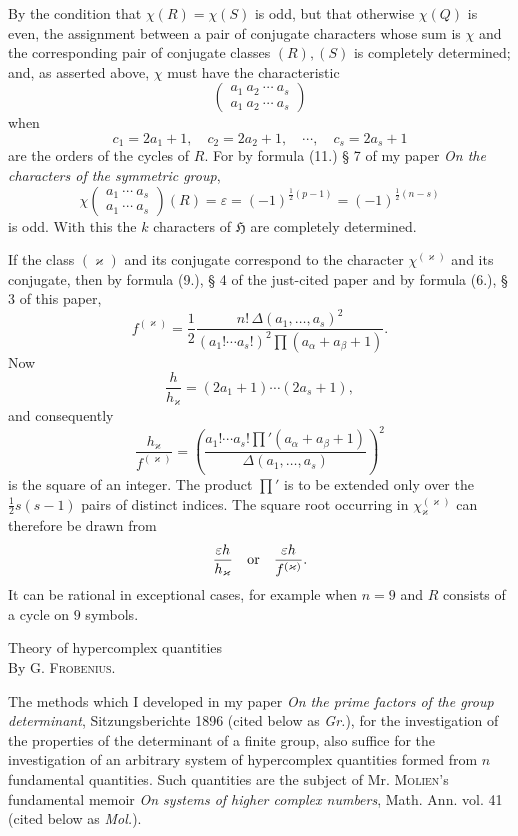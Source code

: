 \documentclass[11pt]{article}
\newcommand{\Hgr}{\mathfrak{H}}
\newcommand{\eps}{\varepsilon}
\newcommand{\frobtitle}[1]{\begin{center}{\Large #1}\\[0.75em]By G. \textsc{Frobenius}.\end{center}\vspace{0.5em}}
\newcommand{\ch}[2]{\left(\begin{smallmatrix}#1\\#2\end{smallmatrix}\right)}
\begin{document}
By the condition that $\chi(R)=\chi(S)$ is odd, but that otherwise $\chi(Q)$ is even, the assignment between a pair of conjugate characters whose sum is $\chi$ and the corresponding pair of conjugate classes $(R),(S)$ is completely determined; and, as asserted above, $\chi$ must have the characteristic
\[
 \ch{a_1\ a_2\ \cdots\ a_s}{a_1\ a_2\ \cdots\ a_s}
\]
when
\[
 c_1=2a_1+1,	\quad c_2=2a_2+1,	\quad \cdots,	\quad c_s=2a_s+1
\]
are the orders of the cycles of $R$. For by formula (11.) § 7 of my paper \emph{On the characters of the symmetric group},
\[
 \chi\ch{a_1\ \cdots\ a_s}{a_1\ \cdots\ a_s}(R)=\eps=(-1)^{\frac12(p-1)}=(-1)^{\frac12(n-s)}
\]
is odd. With this the $k$ characters of $\Hgr$ are completely determined.

If the class $(\varkappa)$ and its conjugate correspond to the character $\chi^{(\varkappa)}$ and its conjugate, then by formula (9.), § 4 of the just-cited paper and by formula (6.), § 3 of this paper,
\[
 f^{(\varkappa)}=\frac12\frac{n!\,\Delta(a_1,\ldots,a_s)^2}{(a_1!\cdots a_s!)^2\prod(a_\alpha+a_\beta+1)}.
\]
Now
\[
 \frac{h}{h_\varkappa}=(2a_1+1)\cdots(2a_s+1),
\]
and consequently
\begin{equation}\tag{2.}
 \frac{h_\varkappa}{f^{(\varkappa)}}=\left(\frac{a_1!\cdots a_s!\prod'(a_\alpha+a_\beta+1)}{\Delta(a_1,\ldots,a_s)}\right)^2
\end{equation}
is the square of an integer. The product $\prod'$ is to be extended only over the $\frac12s(s-1)$ pairs of distinct indices. The square root occurring in $\chi^{(\varkappa)}_\varkappa$ can therefore be drawn from
\[
 \frac{\eps h}{h_\varkappa}\quad\hbox{or}\quad \frac{\eps h}{f^{(\varkappa)}}.
\]
It can be rational in exceptional cases, for example when $n=9$ and $R$ consists of a cycle on $9$ symbols.

\clearpage

\frobtitle{Theory of hypercomplex quantities}

The methods which I developed in my paper \emph{On the prime factors of the group determinant}, Sitzungsberichte 1896 (cited below as \emph{Gr.}), for the investigation of the properties of the determinant of a finite group, also suffice for the investigation of an arbitrary system of hypercomplex quantities formed from $n$ fundamental quantities. Such quantities are the subject of Mr. \textsc{Molien}'s fundamental memoir \emph{On systems of higher complex numbers}, Math. Ann. vol. 41 (cited below as \emph{Mol.}).
\end{document}
